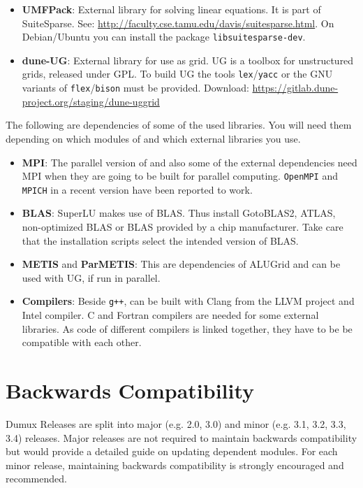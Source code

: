 \begin{itemize}
\item \textbf{UMFPack}: External library for solving linear equations. It is part of SuiteSparse.
  See: \url{http://faculty.cse.tamu.edu/davis/suitesparse.html}. On Debian/Ubuntu you can install the package \texttt{libsuitesparse-dev}.

\item \textbf{dune-UG}: External library for use as grid. UG is a toolbox for unstructured grids, released under GPL.
  To build UG the tools \texttt{lex}/\texttt{yacc} or the GNU variants of \texttt{flex}/\texttt{bison} must be provided.
  Download: \url{https://gitlab.dune-project.org/staging/dune-uggrid}
\end{itemize}

The following are dependencies of some of the used libraries. You will need them
depending on which modules of \Dune and which external libraries you use.

\begin{itemize}
\item \textbf{MPI}: The parallel version of \Dune and also some of the external dependencies need MPI
  when they are going to be built for parallel computing. \texttt{OpenMPI} and \texttt{MPICH} in a recent
  version have been reported to work.

\item \textbf{BLAS}: SuperLU makes use of BLAS. Thus install GotoBLAS2, ATLAS, non-optimized BLAS
  or BLAS provided by a chip manufacturer. Take care that the installation scripts select the intended
  version of BLAS.

\item \textbf{METIS} and \textbf{ParMETIS}: This are dependencies of ALUGrid and can be used with UG, if run in parallel.

\item \textbf{Compilers}: Beside \texttt{g++}, \Dune can be built with Clang from the LLVM project and
  Intel \Cplusplus compiler. C and Fortran compilers are needed for some external libraries. As code of
  different compilers is linked together, they have to be be compatible with each other.
\end{itemize}

\section{Backwards Compatibility}
\label{sec:backwardscompatibility}

Dumux Releases are split into major (e.g. 2.0, 3.0) and minor (e.g. 3.1, 3.2, 3.3, 3.4) releases.
Major releases are not required to maintain backwards compatibility 
but would provide a detailed guide on updating dependent modules.
For each minor release, maintaining backwards compatibility is strongly encouraged and recommended.

